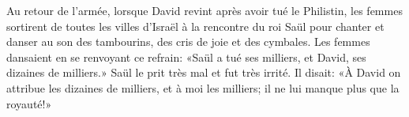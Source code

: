 Au retour de l’armée, lorsque David revint après avoir tué le Philistin,
	les femmes sortirent de toutes les villes d’Israël à la rencontre du roi Saül
	pour chanter et danser au son des tambourins, des cris de joie et des cymbales.
Les femmes dansaient en se renvoyant ce refrain:
	«Saül a tué ses milliers, et David, ses dizaines de milliers.»
Saül le prit très mal et fut très irrité.
Il disait: «À David on attribue les dizaines de milliers, et à moi les milliers;
	il ne lui manque plus que la royauté!»
